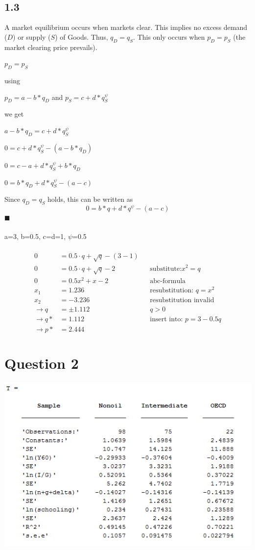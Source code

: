 \documentclass{article}
\begin{document}
\subsection*{1.3}
A market equilibrium occurs when markets clear. This implies no excess demand ($D$) or supply ($S$) of Goods. Thus, $q_D = q_S$. This only occurs when $p_D = p_S$ (the market clearing price prevails).
\begin{center} $p_D = p_S$ \end{center}
using
\begin{center} $p_D=a-b*q_D $ and $p_S=c+d*q_S^\psi$\end{center}
 we get
\begin{center} $a-b*q_D =c+d*q_S^\psi$ \end{center}
\begin{center} $0 =c+d*q_S^\psi-(a-b*q_D)$ \end{center}
\begin{center} $0 =c-a+d*q_S^\psi+b*q_D$ \end{center}
\begin{center} $0 =b*q_D+d*q_S^\psi-(a-c)$ \end{center}
Since $q_D = q_S$ holds, this can be written as 
 \begin{equation*} \label{First_One}0=b*q+d*q^\psi-(a-c)\end{equation*} $\blacksquare$\\\\
 a=3, b=0.5, c=d=1, $\psi$=0.5\\\\
 \begin{align*}
 0&=0.5\cdot q+ \sqrt{q}-(3-1) & &\\
 0&=0.5\cdot q+ \sqrt{q}-2 & &\text{substitute:} x^2=q\\
 0&=0.5x^2+x-2&&\text{abc-formula}\\
 x_1&=1.236 &&\text{resubstitution: } q=x^2\\
 x_2&=-3.236&&\text{resubstitution invalid}\\
 \rightarrow q&=\pm 1.112 &&q>0 \\
 \rightarrow q*&=1.112&&\text{insert into: }p=3-0.5q\\
 \rightarrow p*&=2.444&& 
 \end{align*}




\section*{Question 2}

\vspace{1cm}
\includegraphics{Table.png}
\end{document}

